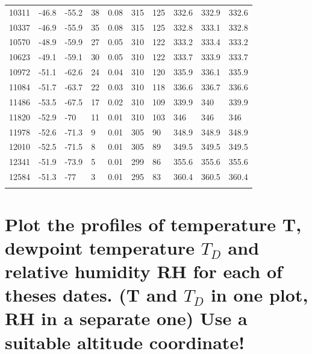 \documentclass{article}
\begin{document}
{\begin{longtable}[h!]{p{}|p{}|p{}|p{}|p{}|p{}|p{}|p{}|p{}|p{}}
    10311 & -46.8 & -55.2 & 38 & 0.08 & 315 & 125 & 332.6 & 332.9 & 332.6 \\
    10337 & -46.9 & -55.9 & 35 & 0.08 & 315 & 125 & 332.8 & 333.1 & 332.8 \\
    10570 & -48.9 & -59.9 & 27 & 0.05 & 310 & 122 & 333.2 & 333.4 & 333.2 \\
    10623 & -49.1 & -59.1 & 30 & 0.05 & 310 & 122 & 333.7 & 333.9 & 333.7 \\
    10972 & -51.1 & -62.6 & 24 & 0.04 & 310 & 120 & 335.9 & 336.1 & 335.9 \\
    11084 & -51.7 & -63.7 & 22 & 0.03 & 310 & 118 & 336.6 & 336.7 & 336.6 \\
    11486 & -53.5 & -67.5 & 17 & 0.02 & 310 & 109 & 339.9 & 340 & 339.9 \\
    11820 & -52.9 & -70 & 11 & 0.01 & 310 & 103 & 346 & 346 & 346 \\
    11978 & -52.6 & -71.3 & 9 & 0.01 & 305 & 90 & 348.9 & 348.9 & 348.9 \\
    12010 & -52.5 & -71.5 & 8 & 0.01 & 305 & 89 & 349.5 & 349.5 & 349.5 \\
    12341 & -51.9 & -73.9 & 5 & 0.01 & 299 & 86 & 355.6 & 355.6 & 355.6 \\
    12584 & -51.3 & -77 & 3 & 0.01 & 295 & 83 & 360.4 & 360.5 & 360.4 \\

  \label{tab:addlabel}%
\end{longtable}}%







\newpage
\section{Plot the profiles of temperature T, dewpoint temperature $T_D$ and relative humidity RH for each of theses dates. (T and $T_D$ in one plot, RH in a separate one) Use a suitable altitude coordinate!}



\newpage
\end{document}
